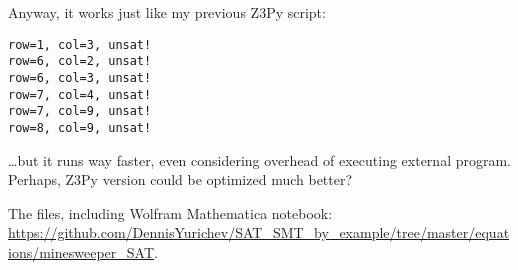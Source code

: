 Anyway, it works just like my previous Z3Py script:

\begin{lstlisting}
row=1, col=3, unsat!
row=6, col=2, unsat!
row=6, col=3, unsat!
row=7, col=4, unsat!
row=7, col=9, unsat!
row=8, col=9, unsat!
\end{lstlisting}

\dots but it runs way faster, even considering overhead of executing external program.
Perhaps, Z3Py version could be optimized much better?

The files, including Wolfram Mathematica notebook: 
\url{https://github.com/DennisYurichev/SAT_SMT_by_example/tree/master/equations/minesweeper_SAT}.

